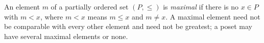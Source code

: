 
An element $m$ of a partially ordered set $(P,\le)$ is \emph{maximal} if there is no $x\in P$ with $m<x$, where $m<x$ means $m\le x$ and $m\ne x$. A maximal element need not be comparable with every other element and need not be greatest; a poset may have several maximal elements or none.
